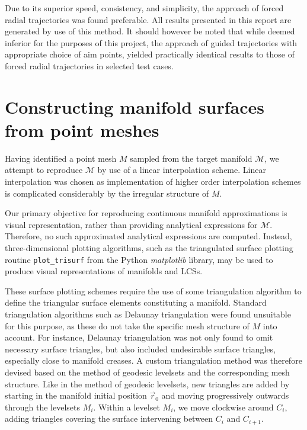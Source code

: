 Due to its superior speed, consistency, and simplicity, the approach of forced radial trajectories was found preferable. All results presented in this report are generated by use of this method. It should however be noted that while deemed inferior for the purposes of this project, the approach of guided trajectories with appropriate choice of aim points, yielded practically identical results to those of forced radial trajectories in selected test cases.
 
\section{Constructing manifold surfaces from point meshes}\label{sec:triangulation}

Having identified a point mesh $M$ sampled from the target manifold $\mathcal{M}$, we attempt to reproduce $\mathcal{M}$ by use of a linear interpolation scheme. Linear interpolation was chosen as implementation of higher order interpolation schemes is complicated considerably by the irregular structure of $M$.

Our primary objective for reproducing continuous manifold approximations is visual representation, rather than providing analytical expressions for $\mathcal{M}$. Therefore, no such approximated analytical expressions are computed. Instead, three-dimensional plotting algorithms, such as the triangulated surface plotting routine \texttt{plot\_}\texttt{trisurf} from the Python \textit{matplotlib} library, may be used to produce visual representations of manifolds and LCSs.

These surface plotting schemes require the use of some triangulation algorithm to define the triangular surface elements constituting a manifold. Standard triangulation algorithms such as Delaunay triangulation \citep{Delaunay} were found unsuitable for this purpose, as these do not take the specific mesh structure of $M$ into account. For instance, Delaunay triangulation was not only found to omit necessary surface triangles, but also included undesirable surface triangles, especially close to manifold creases. A custom triangulation method was therefore devised based on the method of geodesic levelsets and the corresponding mesh structure. Like in the method of geodesic levelsets, new triangles are added by starting in the manifold initial position $\vec{r}_0$ and moving progressively outwards through the levelsets $M_i$. Within a levelset $M_i$, we move clockwise around $C_i$, adding triangles covering the surface intervening between $C_i$ and $C_{i+1}$.   


